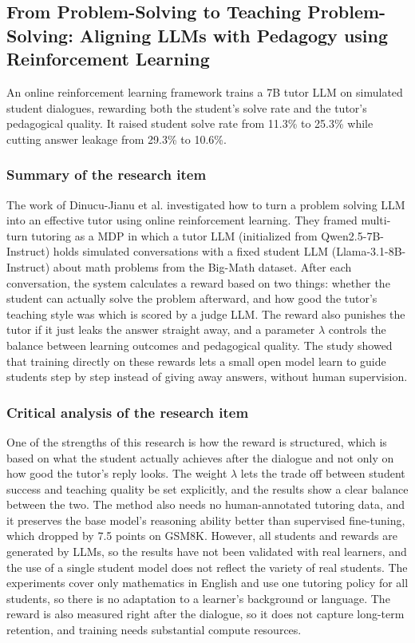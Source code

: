 \documentclass{FastFyp}
\begin{document}
\subsection{From Problem-Solving to Teaching Problem-Solving: Aligning LLMs with Pedagogy using Reinforcement Learning}
An online reinforcement learning framework trains a 7B tutor LLM on simulated student dialogues, rewarding both the student's solve rate and the tutor's pedagogical quality. It raised student solve rate from 11.3\% to 25.3\% while cutting answer leakage from 29.3\% to 10.6\%.
 \subsubsection{Summary of the research item}
 The work of Dinucu-Jianu et al. \cite{dinucujianu2025teaching} investigated how to turn a problem solving LLM into an effective tutor using online reinforcement learning. They framed multi-turn tutoring as a MDP in which a tutor LLM (initialized from Qwen2.5-7B-Instruct) holds simulated conversations with a fixed student LLM (Llama-3.1-8B-Instruct) about math problems from the Big-Math dataset. After each conversation, the system calculates a reward based on two things: whether the student can actually solve the problem afterward, and how good the tutor's teaching style was which is scored by a judge LLM. The reward also punishes the tutor if it just leaks the answer straight away, and a parameter $\lambda$ controls the balance between learning outcomes and pedagogical quality. The study showed that training directly on these rewards lets a small open model learn to guide students step by step instead of giving away answers, without human supervision.

\subsubsection{Critical analysis of the research item}
One of the strengths of this research is how the reward is structured, which is based on what the student actually achieves after the dialogue and not only on how good the tutor's reply looks. The weight $\lambda$ lets the trade off between student success and teaching quality be set explicitly, and the results show a clear balance between the two. The method also needs no human-annotated tutoring data, and it preserves the base model's reasoning ability better than supervised fine-tuning, which dropped by 7.5 points on GSM8K. However, all students and rewards are generated by LLMs, so the results have not been validated with real learners, and the use of a single student model does not reflect the variety of real students. The experiments cover only mathematics in English and use one tutoring policy for all students, so there is no adaptation to a learner's background or language. The reward is also measured right after the dialogue, so it does not capture long-term retention, and training needs substantial compute resources.
\end{document}

